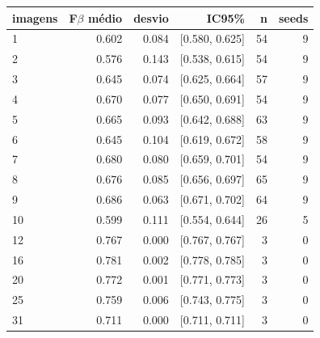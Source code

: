 \begin{tabular}{lrrrrr}
\toprule
imagens & F$\beta$ médio & desvio & IC95\% & n & seeds \\
\midrule
1 & 0.602 & 0.084 & [0.580, 0.625] & 54 & 9 \\
2 & 0.576 & 0.143 & [0.538, 0.615] & 54 & 9 \\
3 & 0.645 & 0.074 & [0.625, 0.664] & 57 & 9 \\
4 & 0.670 & 0.077 & [0.650, 0.691] & 54 & 9 \\
5 & 0.665 & 0.093 & [0.642, 0.688] & 63 & 9 \\
6 & 0.645 & 0.104 & [0.619, 0.672] & 58 & 9 \\
7 & 0.680 & 0.080 & [0.659, 0.701] & 54 & 9 \\
8 & 0.676 & 0.085 & [0.656, 0.697] & 65 & 9 \\
9 & 0.686 & 0.063 & [0.671, 0.702] & 64 & 9 \\
10 & 0.599 & 0.111 & [0.554, 0.644] & 26 & 5 \\
12 & 0.767 & 0.000 & [0.767, 0.767] & 3 & 0 \\
16 & 0.781 & 0.002 & [0.778, 0.785] & 3 & 0 \\
20 & 0.772 & 0.001 & [0.771, 0.773] & 3 & 0 \\
25 & 0.759 & 0.006 & [0.743, 0.775] & 3 & 0 \\
31 & 0.711 & 0.000 & [0.711, 0.711] & 3 & 0 \\
\bottomrule
\end{tabular}
